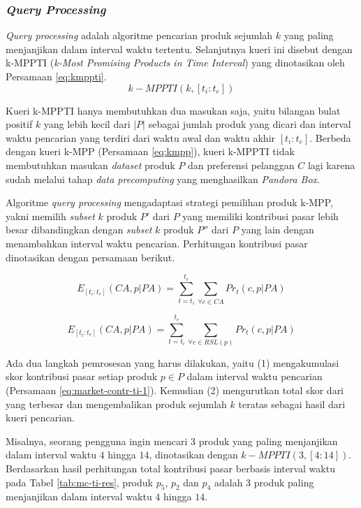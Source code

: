 \subsubsection{\textit{Query Processing}}
\tab \textit{Query processing} adalah algoritme pencarian produk sejumlah $k$ yang paling menjanjikan dalam interval waktu tertentu. Selanjutnya kueri ini disebut dengan k-MPPTI (\textit{k-Most Promising Products in Time Interval}) yang dinotasikan oleh Persamaan \ref{eq:kmppti}. 
\begin{equation}\label{eq:kmppti}
k-MPPTI(k, [t_i:t_e])
\end{equation} 

Kueri k-MPPTI hanya membutuhkan dua masukan saja, yaitu bilangan bulat positif $k$ yang lebih kecil dari $|P|$ sebagai jumlah produk yang dicari dan interval waktu pencarian yang terdiri dari waktu awal dan waktu akhir $[t_i:t_e]$. Berbeda dengan kueri k-MPP (Persamaan \ref{eq:kmpp}), kueri k-MPPTI tidak membutuhkan masukan \textit{dataset} produk $P$ dan preferensi pelanggan $C$ lagi karena sudah melalui tahap \textit{data precomputing} yang menghasilkan \textit{Pandora Box}.  

Algoritme \textit{query processing} mengadaptasi strategi pemilihan produk k-MPP, yakni memilih \textit{subset} $k$ produk $P'$ dari $P$ yang memiliki kontribusi pasar lebih besar dibandingkan dengan \textit{subset} $k$ produk $P''$ dari $P$ yang lain \cite{kmpp} dengan menambahkan interval waktu pencarian. Perhitungan kontribusi pasar dinotasikan dengan persamaan berikut.

\begin{equation}\label{eq:market-contr-ti-2}
E_{[t_i:t_e]}(CA, p|PA) = \sum_{t=t_i}^{t_e} \sum_{\forall c \in CA} Pr_t(c, p|PA)
\end{equation} 

\begin{equation}\label{eq:market-contr-ti-1}
E_{[t_i:t_e]}(CA, p|PA) = \sum_{t=t_i}^{t_e} \sum_{\forall c \in RSL(p)} Pr_t(c, p|PA)
\end{equation} 

Ada dua langkah pemrosesan yang harus dilakukan, yaitu (1) mengakumulasi skor kontribusi pasar setiap produk $p \in P$ dalam interval waktu pencarian (Persamaan \ref{eq:market-contr-ti-1}). Kemudian (2) mengurutkan total skor dari yang terbesar dan mengembalikan produk sejumlah $k$ teratas sebagai hasil dari kueri pencarian. 

Misalnya, seorang pengguna ingin mencari $3$ produk yang paling menjanjikan dalam interval waktu $4$ hingga $14$, dinotasikan dengan $k-MPPTI(3, [4:14])$. Berdasarkan hasil perhitungan total kontribusi pasar berbasis interval waktu pada Tabel \ref{tab:mc-ti-res}, produk $p_5$, $p_2$ dan $p_4$ adalah $3$ produk paling menjanjikan dalam interval waktu $4$ hingga $14$.

